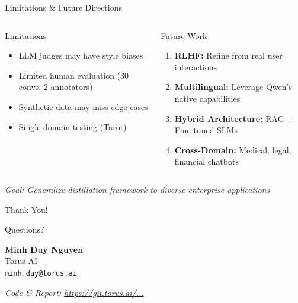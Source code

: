 \documentclass[aspectratio=169]{beamer}
\begin{document}
\begin{frame}{Limitations \& Future Directions}
\begin{columns}[T]
\begin{alertblock}{Limitations}
\begin{itemize}
    \item LLM judges may have style biases
    \item Limited human evaluation (30 convs, 2 annotators)
    \item Synthetic data may miss edge cases
    \item Single-domain testing (Tarot)
\end{itemize}
\end{alertblock}

\begin{block}{Future Work}
\begin{enumerate}
    \item \textbf{RLHF:} Refine from real user interactions
    \item \textbf{Multilingual:} Leverage Qwen's native capabilities
    \item \textbf{Hybrid Architecture:} RAG + Fine-tuned SLMs
    \item \textbf{Cross-Domain:} Medical, legal, financial chatbots
\end{enumerate}
\end{block}
\end{columns}

\vspace{0.5cm}
\begin{center}
\textit{Goal: Generalize distillation framework to diverse enterprise applications}
\end{center}
\end{frame}

\begin{frame}[plain]
\begin{center}
\Huge Thank You!

\vspace{1cm}
\Large Questions?

\vspace{1cm}
\normalsize
\textbf{Minh Duy Nguyen} \\
Torus AI \\
\texttt{minh.duy@torus.ai}

\vspace{0.5cm}
\small
\textit{Code \& Report: \url{https://git.torus.ai/...}}
\end{center}
\end{frame}
\end{document}
